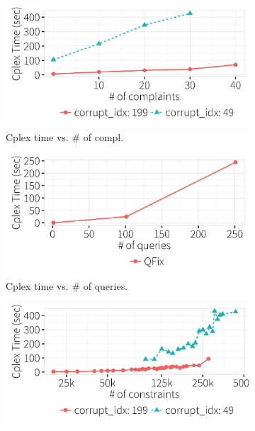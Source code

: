   
  \begin{figure}[t]
  \centering
    \begin{subfigure} [t]{.3\textwidth}
    \includegraphics[width = .99\columnwidth]{figures/num_compl_time}
    \vspace*{-.25in}
    \caption{Cplex time vs. \# of compl. }
    \vspace*{-.1in}
    \label{f:heuristic_acc} 
    \end{subfigure}
    \begin{subfigure} [t]{.3\textwidth}
    \includegraphics[width = .99\columnwidth]{figures/num_queries_time}
    \vspace*{-.25in}
    \caption{Cplex time vs. \# of queries.}
    \vspace*{-.1in}
    \label{f:heuristic_time} 
    \end{subfigure}
    \begin{subfigure} [t]{.3\textwidth}
    \includegraphics[width = .99\columnwidth]{figures/num_cons_time}

\end{subfigure}
\end{figure}
